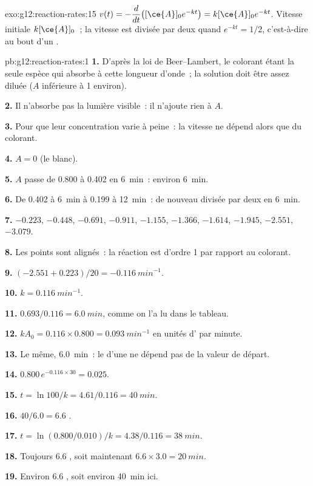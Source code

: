 \begin{solution}{exo:g12:reaction-rates:15}
$v(t) = -\dfrac{d}{dt}\big([\ce{A}]_0 e^{-kt}\big) = k[\ce{A}]_0 e^{-kt}$.
Vitesse initiale $k[\ce{A}]_0$~; la vitesse est divisée par deux quand
$e^{-kt} = 1/2$, c'est-à-dire au bout d'un .
\end{solution}

\begin{solution}{pb:g12:reaction-rates:1}
\textbf{1.} D'après la loi de Beer--Lambert, le colorant étant la seule
espèce qui absorbe à cette longueur d'onde~; la solution doit être assez
diluée ($A$ inférieure à 1 environ).

\textbf{2.} Il n'absorbe pas la lumière visible~: il n'ajoute rien à
$A$.

\textbf{3.} Pour que leur concentration varie à peine~: la vitesse ne
dépend alors que du colorant.

\textbf{4.} $A = 0$ (le blanc).

\textbf{5.} $A$ passe de 0.800 à 0.402 en \qty{6}{min}~: environ
\qty{6}{min}.

\textbf{6.} De 0.402 à \qty{6}{min} à 0.199 à \qty{12}{min}~: de
nouveau divisée par deux en \qty{6}{min}.

\textbf{7.} $-0.223$, $-0.448$, $-0.691$, $-0.911$, $-1.155$, $-1.366$,
$-1.614$, $-1.945$, $-2.551$, $-3.079$.

\textbf{8.} Les points sont alignés~: la réaction est d'ordre 1 par
rapport au colorant.

\textbf{9.} $(-2.551 + 0.223)/20 = \qty{-0.116}{min^{-1}}$.

\textbf{10.} $k = \qty{0.116}{min^{-1}}$.

\textbf{11.} $0.693 / 0.116 = \qty{6.0}{min}$, comme on l'a lu dans le
tableau.

\textbf{12.} $k A_0 = 0.116 \times 0.800 = \qty{0.093}{min^{-1}}$ en
unités d' par minute.

\textbf{13.} Le même, \qty{6.0}{min}~: le  d'une
 ne dépend pas de la valeur de départ.

\textbf{14.} $0.800\, e^{-0.116 \times 30} = 0.025$.

\textbf{15.} $t = \ln 100 / k = 4.61 / 0.116 = \qty{40}{min}$.

\textbf{16.} $40 / 6.0 = 6.6$ .

\textbf{17.} $t = \ln(0.800/0.010)/k = 4.38 / 0.116 = \qty{38}{min}$.

\textbf{18.} Toujours 6.6 , soit maintenant
$6.6 \times 3.0 = \qty{20}{min}$.

\textbf{19.} Environ 6.6 , soit environ
\qty{40}{min} ici.
\end{solution}
